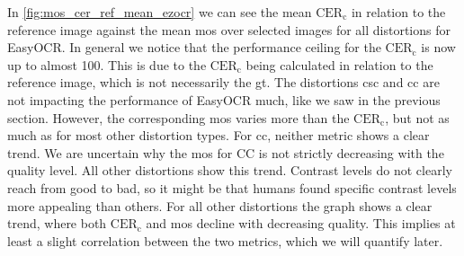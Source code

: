 In \autoref{fig:mos_cer_ref_mean_ezocr} we can see the mean $\text{CER}_{\text{c}}$ in relation to the reference image against the mean \gls{mos} over selected images for all distortions for EasyOCR.
In general we notice that the performance ceiling for the $\text{CER}_{\text{c}}$ is now up to almost 100.
This is due to the $\text{CER}_{\text{c}}$ being calculated in relation to the reference image, which is not necessarily the \gls{gt}.
The distortions \gls{csc} and \gls{cc} are not impacting the performance of EasyOCR much, like we saw in the previous section.
However, the corresponding \gls{mos} varies more than the $\text{CER}_{\text{c}}$, but not as much as for most other distortion types.
For \gls{cc}, neither metric shows a clear trend.
We are uncertain why the \gls{mos} for CC is not strictly decreasing with the quality level.
All other distortions show this trend.
Contrast levels do not clearly reach from good to bad, so it might be that humans found specific contrast levels more appealing than others.
For all other distortions the graph shows a clear trend, where both $\text{CER}_{\text{c}}$ and \gls{mos} decline with decreasing quality.
This implies at least a slight correlation between the two metrics, which we will quantify later.

